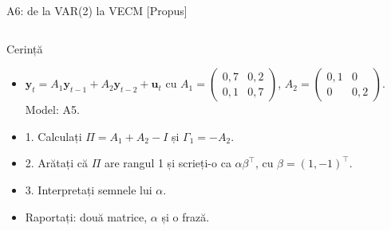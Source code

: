 \begin{frame}{A6: de la VAR(2) la VECM [Propus]}
\propsub
\itemsize{\scriptsize}
\begin{columns}[T]
\begin{column}{\taskw}
\begin{block}{Cerință}
\begin{itemize}
    \item $\mathbf y_t = A_1\mathbf y_{t-1} + A_2\mathbf y_{t-2} + \mathbf u_t$ cu $A_1 = \begin{pmatrix} 0{,}7 & 0{,}2 \\ 0{,}1 & 0{,}7 \end{pmatrix}$, $A_2 = \begin{pmatrix} 0{,}1 & 0 \\ 0 & 0{,}2 \end{pmatrix}$. Model: A5.
    \item 1. Calculați $\Pi = A_1 + A_2 - I$ și $\Gamma_1 = -A_2$.
    \item 2. Arătați că $\Pi$ are rangul 1 și scrieți-o ca $\alpha\beta^\top$, cu $\beta = (1, -1)^\top$.
    \item 3. Interpretați semnele lui $\alpha$.
    \item Raportați: două matrice, $\alpha$ și o frază.
\end{itemize}
\end{block}
\end{column}
\begin{column}{\solw}
\end{column}
\end{columns}
\end{frame}


